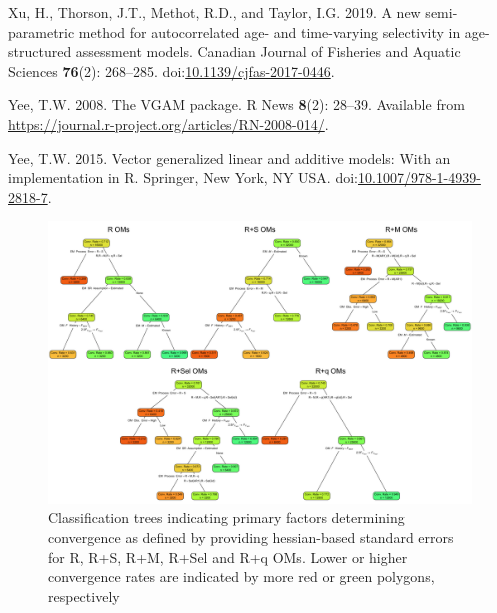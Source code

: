 \documentclass[
  12pt,
]{article}
\newlength{\cslhangindent}
\newenvironment{CSLReferences}[2] %
 {\begin{list}{}{%
  \setlength{\itemindent}{0pt}
  \setlength{\leftmargin}{0pt}
  \setlength{\parsep}{0pt}
  \ifodd #1
   \setlength{\leftmargin}{\cslhangindent}
   \setlength{\itemindent}{-1\cslhangindent}
  \fi
  \setlength{\itemsep}{#2\baselineskip}}}
 {\end{list}}
\begin{document}
\begin{CSLReferences}{1}{0}
Xu, H., Thorson, J.T., Methot, R.D., and Taylor, I.G. 2019. A new
semi-parametric method for autocorrelated age- and time-varying
selectivity in age-structured assessment models. Canadian Journal of
Fisheries and Aquatic Sciences \textbf{76}(2): 268--285.
doi:\href{https://doi.org/10.1139/cjfas-2017-0446}{10.1139/cjfas-2017-0446}.

Yee, T.W. 2008. The {VGAM} package. R News \textbf{8}(2): 28--39.
Available from
\url{https://journal.r-project.org/articles/RN-2008-014/}.

Yee, T.W. 2015. Vector generalized linear and additive models: With an
implementation in {R}. Springer, New York, NY USA.
doi:\href{https://doi.org/10.1007/978-1-4939-2818-7}{10.1007/978-1-4939-2818-7}.

\end{CSLReferences}

\pagebreak

\clearpage

\begin{landscape}
\begin{figure}
\begin{center}
\includegraphics[width = 1.4\textwidth]{convergence_classification_plots}
\end{center}
\caption{Classification trees indicating primary factors determining convergence as defined by providing hessian-based standard errors for R, R+S, R+M, R+Sel and R+q OMs. Lower or higher convergence rates are indicated by more red or green polygons, respectively}\label{conv_class}
\end{figure}
\end{landscape}
\end{document}
